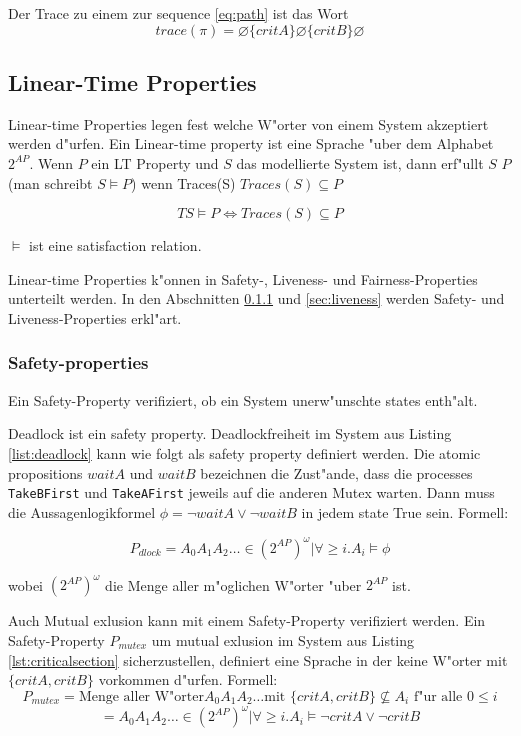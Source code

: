 \documentclass[11pt,twoside,a4paper]{article}
\begin{document}
Der Trace zu einem zur sequence \ref{eq:path} ist das Wort
\[
trace(\pi) = \varnothing \{critA\} \varnothing \{critB\} \varnothing
\]

\subsection{Linear-Time Properties}
\label{sec:satisfactionrelations}

Linear-time Properties legen fest welche W"orter von einem System akzeptiert werden d"urfen. Ein Linear-time property ist eine Sprache "uber dem Alphabet $2^{AP}$.
Wenn $P$ ein LT Property und $S$ das modellierte System ist, dann erf"ullt $S$ $P$ (man schreibt $S \models P$) wenn Traces(S) $ Traces(S) \subseteq P $

\[
TS \models P \iff Traces(S) \subseteq P 
\]

$ \models $ ist eine satisfaction relation. 

Linear-time Properties k"onnen in Safety-, Liveness- und Fairness-Properties unterteilt werden. In den Abschnitten \ref{sec:safety} und \ref{sec:liveness} werden Safety- und Liveness-Properties erkl"art.

\subsubsection{Safety-properties}
\label{sec:safety}

Ein Safety-Property verifiziert, ob ein System unerw"unschte states enth"alt. 

Deadlock ist ein safety property. Deadlockfreiheit im System aus Listing \ref{list:deadlock} kann wie folgt als safety property definiert werden. Die atomic propositions $waitA$ und $waitB$ bezeichnen die Zust"ande, dass die processes \verb|TakeBFirst| und \verb|TakeAFirst| jeweils auf die anderen Mutex warten. Dann muss die Aussagenlogikformel  $\phi=\neg waitA \lor \neg waitB$ in jedem state True sein. Formell:

\[
P_{dlock} = {A_0 A_1 A_2 \dots \in (2^{AP})^{\omega} | \forall \geq i.   A_i \models \phi}
\]

wobei $(2^{AP})^{\omega}$ die Menge aller m"oglichen W"orter "uber $2^{AP}$ ist.

Auch Mutual exlusion kann mit einem Safety-Property verifiziert werden. Ein Safety-Property $P_{mutex}$ um mutual exlusion im System aus Listing \ref{lst:criticalsection} sicherzustellen, definiert eine Sprache in der keine W"orter mit $\{critA,critB\}$ vorkommen d"urfen. Formell:
\[
P_{mutex} = \text{Menge aller W"orter} A_0 A_1 A_2 \dots \text{mit } \{critA,critB\} \not \subseteq A_i \text{ f"ur alle } 0 \leq i
\]
\[
 = {A_0 A_1 A_2 \dots \in (2^{AP})^{\omega} | \forall \geq i.   A_i \models \neg critA \lor \neg critB}
\]
\end{document}

